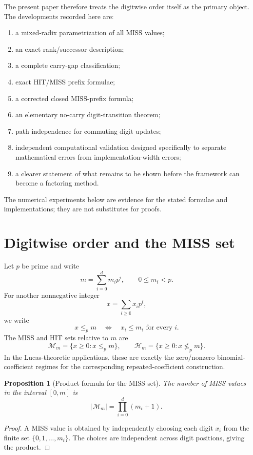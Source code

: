 \documentclass[11pt,a4paper]{article}
\newtheorem{proposition}[theorem]{Proposition}
\theoremstyle{definition}
\theoremstyle{remark}
\newcommand{\Miss}{\mathcal M}
\newcommand{\Hit}{\mathcal H}
\newcommand{\ip}{\le_p}
\begin{document}
The present paper therefore treats the digitwise order itself as the primary object.  The developments recorded here are:
\begin{enumerate}[label=(\arabic*)]
    \item a mixed-radix parametrization of all MISS values;
    \item an exact rank/successor description;
    \item a complete carry-gap classification;
    \item exact HIT/MISS prefix formulae;
    \item a corrected closed MISS-prefix formula;
    \item an elementary no-carry digit-transition theorem;
    \item path independence for commuting digit updates;
    \item independent computational validation designed specifically to separate mathematical errors from implementation-width errors;
    \item a clearer statement of what remains to be shown before the framework can become a factoring method.
\end{enumerate}

The numerical experiments below are evidence for the stated formulae and implementations; they are not substitutes for proofs.

\section{Digitwise order and the MISS set}

Let $p$ be prime and write
\[
 m=\sum_{i=0}^{d} m_i p^i,
 \qquad 0\le m_i<p.
\]
For another nonnegative integer
\[
 x=\sum_{i\ge0}x_i p^i,
\]
we write
\[
 x\ip m
 \quad\Longleftrightarrow\quad
 x_i\le m_i\text{ for every }i.
\]
The MISS and HIT sets relative to $m$ are
\[
\Miss_m=\{x\ge0:x\ip m\},
\qquad
\Hit_m=\{x\ge0:x\not\ip m\}.
\]
In the Lucas-theoretic applications, these are exactly the zero/nonzero binomial-coefficient regimes for the corresponding repeated-coefficient construction.

\begin{proposition}[Product formula for the MISS set]
The number of MISS values in the interval $[0,m]$ is
\[
 |\Miss_m|=
 \prod_{i=0}^{d}(m_i+1).
\]
\end{proposition}
\begin{proof}
A MISS value is obtained by independently choosing each digit $x_i$ from the finite set $\{0,1,\ldots,m_i\}$.  The choices are independent across digit positions, giving the product.
\end{proof}
\end{document}
